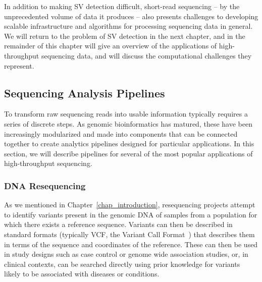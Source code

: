 In addition to making SV detection difficult, short-read sequencing -- by the unprecedented volume of data it produces -- also presents challenges to developing scalable infrastructure and algorithms for processing sequencing data in general. We will return to the problem of SV detection in the next chapter, and in the remainder of this chapter will give an overview of the applications of high-throughput sequencing data, and will discuss the computational challenges they represent.

\subsection{Sequencing Analysis Pipelines}\label{section_pipelines}

To transform raw sequencing reads into usable information typically requires a series of discrete steps. As genomic bioinformatics has matured, these have been increasingly modularized and made into components that can be connected together to create analytics pipelines designed for particular applications. In this section, we will describe pipelines for several of the most popular applications of high-throughput sequencing.

\subsubsection{DNA Resequencing}

As we mentioned in Chapter~\ref{chap_introduction}, resequencing projects attempt to identify variants present in the genomic DNA of samples from a population for which there exists a reference sequence. Variants can then be described in standard formats (typically VCF, the Variant Call Format~\cite{Danecek:2011gz}) that describes them in terms of the sequence and coordinates of the reference. These can then be used in study designs such as case control or genome wide association studies, or, in clinical contexts, can be searched directly using prior knowledge for variants likely to be associated with diseases or conditions.

